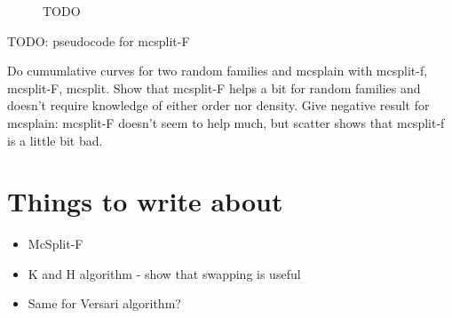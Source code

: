 \begin{figure}[h!]
    \centering
    \caption{TODO}
    \label{figure:TODO4}
\end{figure}

TODO: pseudocode for mcsplit-F

Do cumumlative curves
for two random families and mcsplain with mcsplit-f, mcsplit-F, mcsplit.  Show that mcsplit-F helps a bit for random families
and doesn't require knowledge of either order nor density.  Give negative result for mcsplain: mcsplit-F doesn't seem to help
much, but scatter shows that mcsplit-f is a little bit bad.

\section{Things to write about}

\begin{itemize}
    \item McSplit-F
    \item K and H algorithm - show that swapping is useful
    \item Same for Versari algorithm?
\end{itemize}
